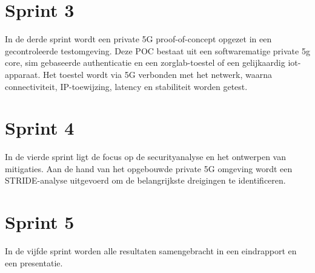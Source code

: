 \section*{Sprint 3}

In de derde sprint wordt een private 5G proof-of-concept opgezet
in een gecontroleerde testomgeving. Deze POC bestaat uit een softwarematige private 5g core, sim gebaseerde authenticatie en een zorglab-toestel of een gelijkaardig iot-apparaat. Het toestel wordt via 5G verbonden met het netwerk, waarna connectiviteit, IP-toewijzing, latency en stabiliteit worden getest.

\section*{Sprint 4}

In de vierde sprint ligt de focus op de securityanalyse en het ontwerpen van mitigaties. Aan de hand van het opgebouwde private 5G omgeving wordt een STRIDE-analyse uitgevoerd om de belangrijkste dreigingen te identificeren.

\section*{Sprint 5}

In de vijfde sprint worden alle resultaten samengebracht in een eindrapport en een presentatie.



